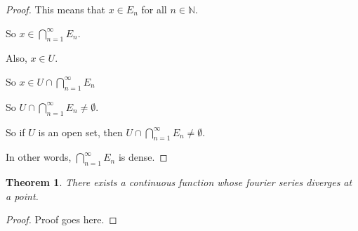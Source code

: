\documentclass{amsart}
\newcommand{\N}{\mathbb{N}}
\newtheorem{thm}{Theorem}[section]
\theoremstyle{definition}
\begin{document}
\begin{proof}
This means that $x \in E_n$ for all $n \in \N$.

So $x \in \bigcap\limits_{n = 1}^{\infty} E_n$.

Also, $x \in U$.

So $x \in U \cap \bigcap\limits_{n = 1}^{\infty} E_n$

So $U \cap \bigcap\limits_{n = 1}^{\infty} E_n \neq \emptyset$.

So if $U$ is an open set, then $U \cap \bigcap\limits_{n = 1}^{\infty} E_n \neq \emptyset$.

In other words, $\bigcap\limits_{n = 1}^{\infty} E_n$ is dense.
\end{proof}

\begin{thm}
There exists a continuous function whose fourier series diverges at a point.
\end{thm}

\begin{proof}

Proof goes here.

\end{proof}
\end{document}
